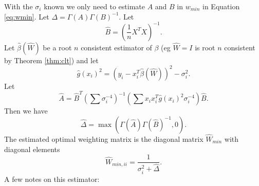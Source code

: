\documentclass[ejs,ps,preprint]{imsart}
\numberwithin{equation}{section}
\theoremstyle{plain}
\begin{document}
With the $\sigma_i$ known we only need to estimate $A$ and $B$ in $w_{min}$ in Equation \eqref{eq:wmin}. Let $\Delta = \Gamma(A)\Gamma(B)^{-1}$. Let
\begin{equation*}
\widehat{B} = \left(\frac{1}{n}X^TX\right)^{-1}.
\end{equation*}
Let $\widehat{\beta}(\widehat{W})$ be a root $n$ consistent estimator of $\beta$ (eg $\widehat{W}=I$ is root $n$ consistent by Theorem \ref{thm:clt}) and let
\begin{equation*}
\widehat{g}(x_i)^2 = (y_i - x_i^T\widehat{\beta}(\widehat{W}))^2 - \sigma_i^2.
\end{equation*}
Let
\begin{equation*}
\widehat{A} = \widehat{B}^T\left(\sum \sigma_i^{-4}\right)^{-1}\left(\sum x_ix_i^T\widehat{g}(x_i)^2\sigma_i^{-4}\right)\widehat{B}.
\end{equation*}
Then we have
\begin{equation}
\label{eq:deltest}
\widehat{\Delta} = \max(\Gamma(\widehat{A})\Gamma(\widehat{B})^{-1},0).
\end{equation}
The estimated optimal weighting matrix is the diagonal matrix $\widehat{W}_{min}$ with diagonal elements
\begin{equation}
\label{eq:est_opt}
\widehat{W}_{min,ii} = \frac{1}{\sigma_i^2 + \widehat{\Delta}}.
\end{equation}
A few notes on this estimator:
\end{document}
